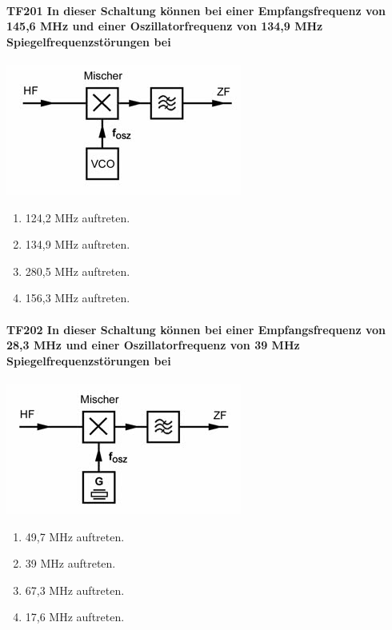 \documentclass[8pt]{article}
\begin{document}
\begin{enumerate}
\paragraph*{TF201 In dieser Schaltung können bei einer Empfangsfrequenz von 145,6 MHz und einer Oszillatorfrequenz von 134,9 MHz Spiegelfrequenzstörungen bei}
\begin{center}
	\begin{minipage}{\linewidth}
		\centering
		\includegraphics[scale=1.0]{pics/tf201_a.jpg}
	\end{minipage}
\end{center}
\begin{enumerate}[nolistsep,label=\Alph*]
\item 124,2 MHz auftreten.
\item 134,9 MHz auftreten.
\item 280,5 MHz auftreten.
\item 156,3 MHz auftreten.
\end{enumerate}

\paragraph*{TF202 In dieser Schaltung können bei einer Empfangsfrequenz von 28,3 MHz und einer Oszillatorfrequenz von 39 MHz Spiegelfrequenzstörungen bei}
\begin{center}
	\begin{minipage}{\linewidth}
		\centering
		\includegraphics[scale=1.0]{pics/tf202_a.jpg}
	\end{minipage}
\end{center}
\begin{enumerate}[nolistsep,label=\Alph*]
\item 49,7 MHz auftreten.
\item 39 MHz auftreten.
\item 67,3 MHz auftreten.
\item 17,6 MHz auftreten.
\end{enumerate}


\end{enumerate}
\end{document}
